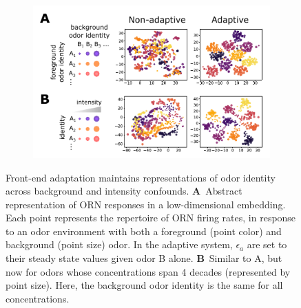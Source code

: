 \documentclass[10pt,prl,aps,showpacs,twocolumn,unsortedaddress]{revtex4-1}
\begin{document}
\begin{figure}[!tb]
	\centering
	\begin{subfigure}[t]{\linewidth}
		\includegraphics[width=\textwidth]{figures/2_coding_representation}
		\label{fig:coding_a}
	\end{subfigure}
	\begin{subfigure}[t]{0\linewidth}
		\label{fig:coding_b}
	\end{subfigure}
	\caption{\footnotesize{Front-end adaptation maintains representations of odor identity across background and intensity confounds.
	\textbf{A}~Abstract representation of ORN responses in a low-dimensional embedding. Each point represents the repertoire of ORN firing rates, in response to an odor environment with both a foreground (point color) and background (point size) odor. In the adaptive system, $\epsilon_a$ are set to their steady state values given odor B alone.
    \textbf{B}~Similar to A, but now for odors whose concentrations span 4 decades (represented by point size). Here, the background odor identity is the same for all concentrations. }}
	\label{fig:coding}
\end{figure}
\end{document}
